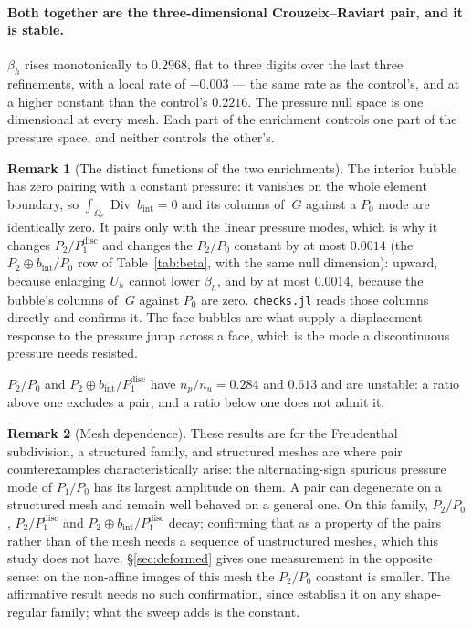\documentclass[11pt]{article}
\newcommand{\Div}{\operatorname{Div}}
\newcommand{\code}[1]{\texttt{#1}}
\theoremstyle{definition}
\newtheorem{remark}{Remark}
\theoremstyle{plain}
\begin{document}
\paragraph{Both together are the three-dimensional Crouzeix--Raviart pair, and
it is stable.} $\beta_h$ rises monotonically to $0.2968$, flat to three digits
over the last three refinements, with a local rate of $-0.003$ --- the
same rate as the control's, and at a higher constant than the control's
$0.2216$. The pressure null space is one dimensional at every mesh. Each part
of the enrichment controls one part of the pressure space, and neither
controls the other's.

\begin{remark}[The distinct functions of the two enrichments]
\label{rem:whyface}
The interior bubble has zero pairing with a constant pressure: it vanishes on
the whole element boundary, so $\int_{\Omega_e}\!\Div ~b_{\mathrm{int}} = 0$
and its columns of $~G$ against a $P_0$ mode are identically zero. It pairs
only with the linear pressure modes, which is why it changes
$P_2/P_1^{\mathrm{disc}}$ and changes the $P_2/P_0$ constant by at most
$0.0014$ (the $P_2 \oplus b_{\mathrm{int}}/P_0$ row of Table~\ref{tab:beta},
with the same null dimension): upward, because enlarging $U_h$ cannot lower
$\beta_h$, and by at most $0.0014$, because the bubble's columns of $~G$
against $P_0$ are zero.
\code{checks.jl} reads those columns directly and confirms it. The face bubbles are what supply a displacement response to
the pressure jump across a face, which is the mode a discontinuous pressure
needs resisted.
\end{remark}

$P_2/P_0$ and $P_2 \oplus b_{\mathrm{int}}/P_1^{\mathrm{disc}}$ have
$n_p/n_u = 0.284$ and $0.613$ and are unstable: a ratio above one excludes a
pair, and a ratio below one does not admit it.

\begin{remark}[Mesh dependence]
\label{rem:structured}
These results are for the Freudenthal subdivision, a structured family, and
structured meshes are where pair counterexamples characteristically arise:
the alternating-sign spurious pressure mode of $P_1/P_0$ has its largest
amplitude on them. A pair can degenerate on a structured mesh and remain well
behaved on a general one. On this family, $P_2/P_0$,
$P_2/P_1^{\mathrm{disc}}$ and $P_2 \oplus b_{\mathrm{int}}/P_1^{\mathrm{disc}}$
decay; confirming that as a property of the pairs rather than of the mesh
needs a sequence of unstructured meshes, which this study does not have.
\S\ref{sec:deformed} gives one measurement in the opposite sense: on the
non-affine images of this mesh the $P_2/P_0$ constant is smaller. The affirmative result
needs no such confirmation, since \citet[Example~8.7.2]{BoffiBrezziFortin:2013}
establish it on any shape-regular family; what the sweep adds is the constant.
\end{remark}
\end{document}
